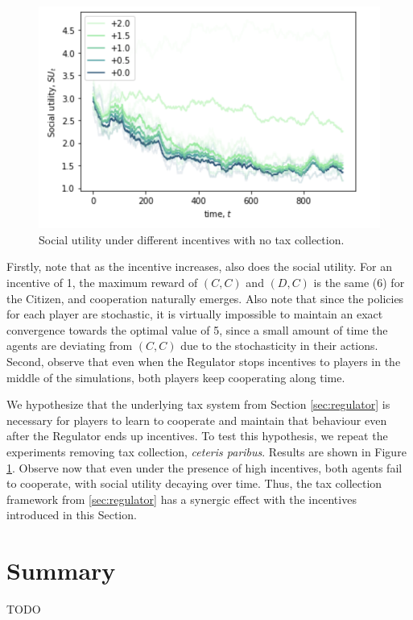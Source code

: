 \begin{figure}[!h]
\centering
\includegraphics[width=0.6\linewidth]{img/inc2.png}
\caption{Social utility under different incentives with no tax collection.}\label{fig:inc2}
\end{figure}


Firstly, note that as the incentive increases, also does the social utility.
For an incentive of 1, the maximum reward of $(C, C)$ and $(D, C)$ is the same (6) for the Citizen, and cooperation naturally emerges. Also note that since the policies for each player are stochastic, it is virtually impossible to maintain an exact convergence towards the optimal value of 5, since a small amount of time the agents are deviating from $(C,C)$ due to the stochasticity in their actions. Second,
observe that even when the Regulator stops incentives to players in the middle of the simulations, both players keep cooperating along time.

We hypothesize that the underlying tax system from Section \ref{sec:regulator} is necessary for players to learn to cooperate and maintain that behaviour even after the Regulator ends up incentives. To test this hypothesis, we repeat the experiments removing tax collection, \emph{ceteris paribus}. Results are shown in Figure \ref{fig:inc2}. Observe now that even under the presence of high incentives, both agents fail to cooperate, with social utility decaying over time. Thus,  the tax collection framework from \ref{sec:regulator} has a synergic effect with the incentives introduced in this Section.



\section{Summary}

TODO
